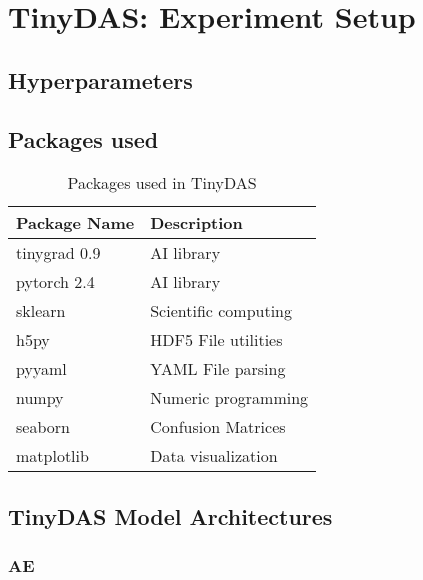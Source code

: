 \chapter{TinyDAS: Experiment Setup}
\label{app:tinydas-exp}

\section{Hyperparameters}
\label{app:hyper}





\section{Packages used}
\label{app:tinypacks}

\begin{table}[!htbp]
\centering
\caption{Packages used in TinyDAS}
\label{tab:tinydas-packages}
\small
\begin{tabular}{>{\raggedright\arraybackslash}p{}>{\raggedright\arraybackslash}p{}}
\toprule
\textbf{Package Name} & \textbf{Description} \\
\midrule
\rowcolor{gray!10} tinygrad 0.9 & AI library \\
pytorch 2.4 & AI library \\
\rowcolor{gray!10} sklearn & Scientific computing \\
h5py & HDF5 File utilities \\
\rowcolor{gray!10} pyyaml & YAML File parsing \\
numpy & Numeric programming \\
\rowcolor{gray!10} seaborn & Confusion Matrices \\
matplotlib & Data visualization \\
\bottomrule
\end{tabular}
\end{table}


\section{TinyDAS Model Architectures}
\label{app:archs}

\subsection{AE}
\label{app:a-ae}

